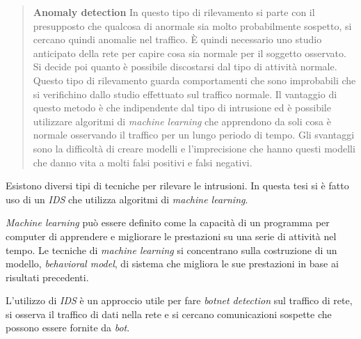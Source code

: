 \documentclass[../main.tex]{subfiles}
\begin{document}
\begin{verse}
				\textbf{Anomaly detection} In questo tipo di rilevamento si parte con il presupposto che qualcosa di anormale sia molto probabilmente sospetto, si cercano quindi anomalie nel traffico. È quindi necessario uno studio anticipato della rete per capire cosa sia normale per il soggetto osservato. Si decide poi quanto è possibile discostarsi dal tipo di attività normale. Questo tipo di rilevamento guarda comportamenti che sono improbabili che si verifichino dallo studio effettuato sul traffico normale.  
				Il vantaggio di questo metodo è che indipendente dal tipo di intrusione ed è possibile utilizzare algoritmi di \textit{machine learning} che apprendono da soli cosa è normale osservando il traffico per un lungo periodo di tempo.
				Gli svantaggi sono la difficoltà di creare modelli e l'imprecisione che hanno questi modelli che danno vita a molti falsi positivi e falsi negativi.
\end{verse}






Esistono diversi tipi di tecniche per rilevare le intrusioni. In questa tesi si è fatto uso di un \textit{IDS} che utilizza algoritmi di \textit{machine learning}.

\textit{Machine learning} può essere definito come la capacità di un programma per computer di apprendere e migliorare le prestazioni su una serie di attività nel tempo. Le tecniche di \textit{machine learning} si concentrano sulla costruzione di un modello, \textit{behavioral model}, di sistema che migliora le sue prestazioni in base ai risultati precedenti. \newline


L'utilizzo di \textit{IDS} è un approccio utile per fare \textit{botnet detection} sul traffico di rete, si osserva il traffico di dati nella rete e si cercano comunicazioni sospette che possono essere fornite da \textit{bot}. \newline
\end{document}
